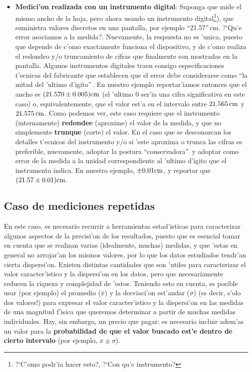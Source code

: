 \documentclass[a4paper]{report}
\begin{document}
\begin{itemize}
\item \textbf{Medici'on realizada con un instrumento digital}: Suponga que mide el mismo ancho de la hoja, pero ahora usando un instrumento digital\footnote{?`C'omo podr'ia hacer esto?, ?`Con qu'e instrumento?}), que suministra valores discretos en una pantalla, por ejemplo ``21.57''\,cm. ?`Qu'e error asociamos a la medida?. Nuevamente, la respuesta no es 'unica, puesto que depende de c'omo exactamente funciona el dispositivo, y de c'omo realiza el redondeo y/o truncamiento de cifras que finalmente son mostradas en la pantalla. Algunos instrumentos digitales traen consigo especificaciones t'ecnicas del fabricante que establecen que el error debe considerarse como ``la mitad del 'ultimo d'igito''\,. En nuestro ejemplo reportar'iamos entonces que el ancho es $(21.570\pm 0.005)\rm cm$ (el 'ultimo 0 ser'ia una cifra significativa en este caso) o, equivalentemente, que el valor est'a en el intervalo entre $21.565\,\rm cm$ y $21.575\,\rm cm$. Como podemos ver, este caso requiere que el instrumento (internamente) \textbf{redondee} (aproxime) el valor de la medida, y que no simplemente \textbf{trunque} (corte) el valor. En el caso que se desconozcan los detalles t'ecnicos del instrumento y/o si 'este aproxima o trunca las cifras es preferible, nuevamente, adoptar la postura ``conservadora''\, y adoptar como error de la medida a la unidad correspondiente al 'ultimo d'igito que el instrumento indica. En nuestro ejemplo, $\pm 0.01\rm cm$, y reportar que $(21.57\pm 0.01)\rm cm$.
\end{itemize}

\subsection{Caso de mediciones repetidas}

En este caso, es necesario recurrir a herramientas estad'isticas para caracterizar algunos aspectos de la precisi'on de los resultados, puesto que es esencial tomar en cuenta que se realizan varias (idealmente, muchas) medidas, y que 'estas en general no arrojar'an los mismos valores, por lo que los datos estudiados tendr'an cierta dispersi'on. Existen distintas cantidades que son 'utiles para caracterizar el valor caracter'istico y la dispersi'on en los datos, pero que necesariamente reducen la riqueza y complejidad de 'estos. Teniendo esto en cuenta, es posible usar (por ejemplo) el promedio ($\bar{x}$) y la desviaci'on est'andar ($\sigma$) (es decir, s'olo dos valores!) para expresar el valor caracter'istico y la dispersi'on en las medidas de una magnitud f'isica que queremos determinar a partir de muchas medidas individuales. Hay, sin embargo, un precio que pagar: es necesario incluir adem'as un valor para la \textbf{probabilidad de que el valor buscado est'e dentro de cierto intervalo} (por ejemplo, $\bar{x}\pm \sigma$).
\end{document}
